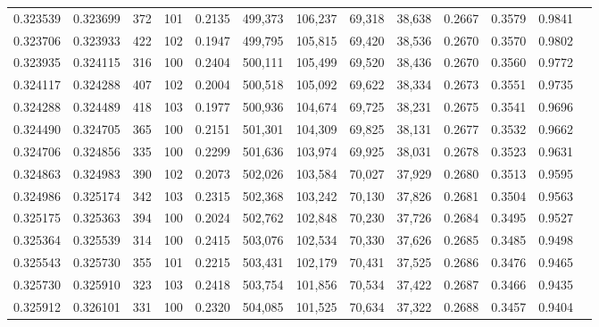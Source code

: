 \begin{tabular}{rrrrrrrrrrrrr}
0.323539 & 0.323699 &   372 & 101 &                                     0.2135 & 499,373 & 106,237 &  69,318 &  38,638 & 0.2667 & 0.3579 & 0.9841 \\
0.323706 & 0.323933 &   422 & 102 &                                     0.1947 & 499,795 & 105,815 &  69,420 &  38,536 & 0.2670 & 0.3570 & 0.9802 \\
0.323935 & 0.324115 &   316 & 100 &                                     0.2404 & 500,111 & 105,499 &  69,520 &  38,436 & 0.2670 & 0.3560 & 0.9772 \\
0.324117 & 0.324288 &   407 & 102 &                                     0.2004 & 500,518 & 105,092 &  69,622 &  38,334 & 0.2673 & 0.3551 & 0.9735 \\
0.324288 & 0.324489 &   418 & 103 &                                     0.1977 & 500,936 & 104,674 &  69,725 &  38,231 & 0.2675 & 0.3541 & 0.9696 \\
0.324490 & 0.324705 &   365 & 100 &                                     0.2151 & 501,301 & 104,309 &  69,825 &  38,131 & 0.2677 & 0.3532 & 0.9662 \\
0.324706 & 0.324856 &   335 & 100 &                                     0.2299 & 501,636 & 103,974 &  69,925 &  38,031 & 0.2678 & 0.3523 & 0.9631 \\
0.324863 & 0.324983 &   390 & 102 &                                     0.2073 & 502,026 & 103,584 &  70,027 &  37,929 & 0.2680 & 0.3513 & 0.9595 \\
0.324986 & 0.325174 &   342 & 103 &                                     0.2315 & 502,368 & 103,242 &  70,130 &  37,826 & 0.2681 & 0.3504 & 0.9563 \\
0.325175 & 0.325363 &   394 & 100 &                                     0.2024 & 502,762 & 102,848 &  70,230 &  37,726 & 0.2684 & 0.3495 & 0.9527 \\
0.325364 & 0.325539 &   314 & 100 &                                     0.2415 & 503,076 & 102,534 &  70,330 &  37,626 & 0.2685 & 0.3485 & 0.9498 \\
0.325543 & 0.325730 &   355 & 101 &                                     0.2215 & 503,431 & 102,179 &  70,431 &  37,525 & 0.2686 & 0.3476 & 0.9465 \\
0.325730 & 0.325910 &   323 & 103 &                                     0.2418 & 503,754 & 101,856 &  70,534 &  37,422 & 0.2687 & 0.3466 & 0.9435 \\
0.325912 & 0.326101 &   331 & 100 &                                     0.2320 & 504,085 & 101,525 &  70,634 &  37,322 & 0.2688 & 0.3457 & 0.9404 \\

\end{tabular}
